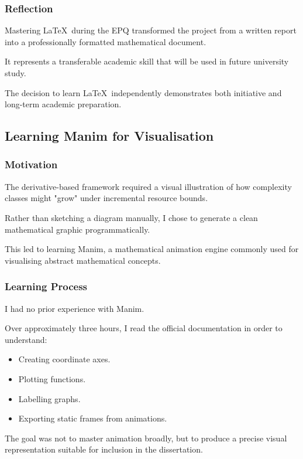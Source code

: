 \documentclass[12pt]{article}
\begin{document}
\subsubsection*{Reflection}

Mastering \LaTeX\ during the EPQ transformed the project from a written report into a professionally formatted mathematical document.

It represents a transferable academic skill that will be used in future university study.

The decision to learn \LaTeX\ independently demonstrates both initiative and long-term academic preparation.

\subsection{Learning Manim for Visualisation}

\subsubsection*{Motivation}

The derivative-based framework required a visual illustration of how complexity classes might "grow" under incremental resource bounds.

Rather than sketching a diagram manually, I chose to generate a clean mathematical graphic programmatically.

This led to learning Manim, a mathematical animation engine commonly used for visualising abstract mathematical concepts.

\subsubsection*{Learning Process}

I had no prior experience with Manim.

Over approximately three hours, I read the official documentation in order to understand:

\begin{itemize}
\item Creating coordinate axes.
\item Plotting functions.
\item Labelling graphs.
\item Exporting static frames from animations.
\end{itemize}

The goal was not to master animation broadly, but to produce a precise visual representation suitable for inclusion in the dissertation.
\end{document}
